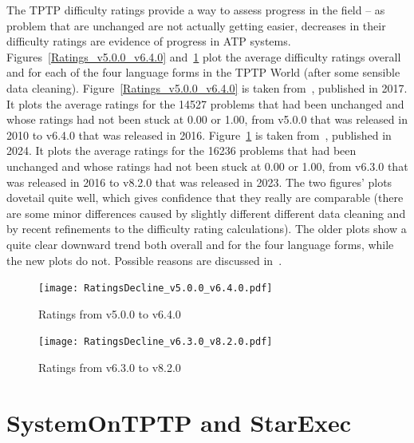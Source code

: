 \documentclass{easychair}
\begin{document}
The TPTP difficulty ratings provide a way to assess progress in the field -- as problem that 
are unchanged are not actually getting easier, decreases in their difficulty ratings are evidence 
of progress in ATP systems.
Figures~\ref{Ratings_v5.0.0_v6.4.0} and~\ref{Ratings_v6.3.0_v8.2.0} plot the average difficulty
ratings overall and for each of the four language forms in the TPTP World (after some sensible
data cleaning).
Figure~\ref{Ratings_v5.0.0_v6.4.0} is taken from~\cite{Sut17}, published in 2017.
It plots the average ratings for the 14527 problems that had been unchanged and whose ratings 
had not been stuck at 0.00 or 1.00, from v5.0.0 that was released in 2010 to v6.4.0 that was
released in 2016. 
Figure~\ref{Ratings_v6.3.0_v8.2.0} is taken from~\cite{SK+24}, published in 2024.
It plots the average ratings for the 16236 problems that had been unchanged and whose ratings 
had not been stuck at 0.00 or 1.00, from v6.3.0 that was released in 2016 to v8.2.0 that was
released in 2023. 
The two figures’ plots dovetail quite well, which gives confidence that they really are 
comparable (there are some minor differences caused by slightly different different data cleaning 
and by recent refinements to the difficulty rating calculations). 
The older plots show a quite clear downward trend both overall and for the four language forms, 
while the new plots do not. 
Possible reasons are discussed in~\cite{SK+24}.

\begin{figure}[t!]
\centering
\begin{minipage}[t]{.49\textwidth}
  \centering
  \texttt{[image: RatingsDecline\_v5.0.0\_v6.4.0.pdf]}
  \vspace*{-2em}
  \caption{Ratings from v5.0.0 to v6.4.0}
  \label{Ratings_v5.0.0_v6.4.0}
\end{minipage}
\begin{minipage}[t]{.49\textwidth}
  \centering
  \texttt{[image: RatingsDecline\_v6.3.0\_v8.2.0.pdf]}
  \vspace*{-2em}
  \caption{Ratings from v6.3.0 to v8.2.0}
  \label{Ratings_v6.3.0_v8.2.0}
\end{minipage}
\end{figure}


\section{SystemOnTPTP and StarExec}
\label{StarExec}
\end{document}

